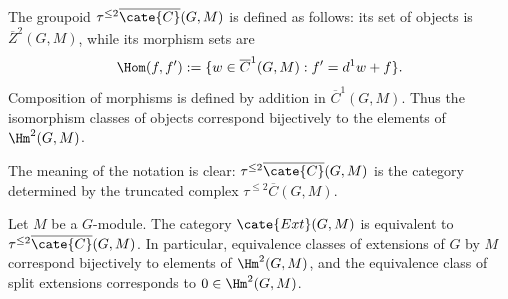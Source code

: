 \begin{definition}
	The groupoid $\tau^{\leq2}\overline{\cate{C}}(G,M)$ is defined as follows:
	its set of objects is $\overline{Z}^2(G,M)$, while its morphism sets are
	\[ \Hom(f,f'):=\{w\in\overline{C}^1(G,M):f'=d^1w+f\}. \]
	Composition of morphisms is defined by addition in
	$\overline{C}^1(G,M)$. Thus the isomorphism classes of objects correspond
	bijectively to the elements of $\Hm^2(G,M)$.
\end{definition}

The meaning of the notation is clear:
$\tau^{\leq2}\overline{\cate{C}}(G,M)$ is the category determined by the
truncated complex $\tau^{\leq2}\overline{C}(G,M)$.

\begin{theorem}\label{prop:factor-set}
	Let $M$ be a $G$-module. The category $\cate{Ext}(G,M)$ is equivalent to
	$\tau^{\leq2}\overline{\cate{C}}(G,M)$. In particular, equivalence
	classes of extensions of $G$ by $M$ correspond bijectively to elements
	of $\Hm^2(G,M)$, and the equivalence class of split extensions
	corresponds to $0\in\Hm^2(G,M)$.
\end{theorem}
